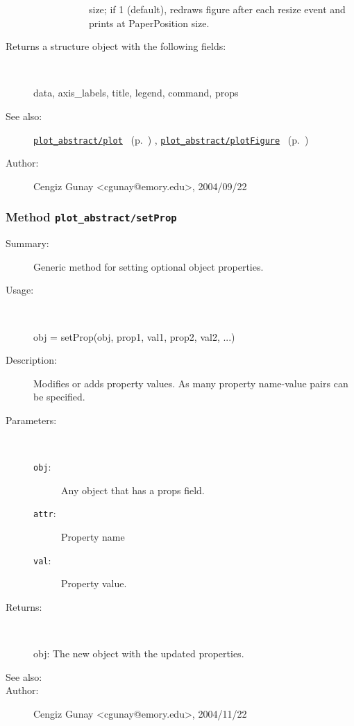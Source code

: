 \begin{description}
\begin{description}
\begin{description}
size; if 1 (default), redraws figure after each resize event and 
prints at PaperPosition size.\end{description}%
\end{description}%
%
\item[Returns a structure object with the following fields:]~

	data, axis\_labels, title, legend, command, props
%
%
\item[See also:]%
\hyperlink{ref_plot_abstract__plot}{\texttt{plot\_abstract/plot}}%
\ (p.~\pageref{ref_plot_abstract__plot})%
%
, \hyperlink{ref_plot_abstract__plotFigure}{\texttt{plot\_abstract/plotFigure}}%
\ (p.~\pageref{ref_plot_abstract__plotFigure})%
%
%
\item[Author:]%
Cengiz Gunay <cgunay@emory.edu>, 2004/09/22%
\end{description}
\methodline%
\subsubsection[Method \texttt{setProp}]{Method \texttt{plot\_abstract/setProp}}%
%
\label{ref_plot_abstract__setProp}%
\hypertarget{ref_plot_abstract__setProp}{}%
\begin{description}
\item[Summary:]Generic method for setting optional object properties.
%
\item[Usage:]~%
\begin{lyxcode}%
obj = setProp(obj, prop1, val1, prop2, val2, ...)
%
\end{lyxcode}%
%
\item[Description:]%
Modifies or adds property values. As many property name-value 
 pairs can be specified.
\item[Parameters:]~
\begin{description}%
\item[\texttt{obj}:]
 Any object that has a props field.
\item[\texttt{attr}:]
 Property name
\item[\texttt{val}:]
 Property value.
\end{description}%
%
\item[Returns:]~

	obj: The new object with the updated properties.
%
%
\item[See also:]%
%
\item[Author:]%
Cengiz Gunay <cgunay@emory.edu>, 2004/11/22%
\end{description}
\methodline%
